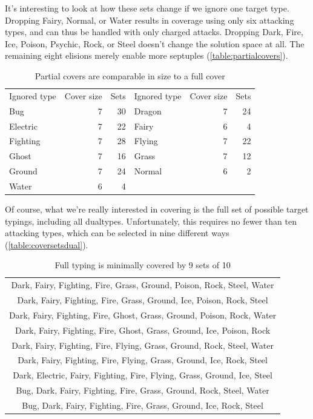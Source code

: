 It's interesting to look at how these sets change if we ignore one target type.
Dropping Fairy, Normal, or Water results in coverage using only six attacking types,
  and can thus be handled with only charged attacks.
Dropping Dark, Fire, Ice, Poison, Psychic, Rock, or Steel doesn't change the solution space at all.
The remaining eight elisions merely enable more septuples (\autoref{table:partialcovers}).
\begin{table}[ht]
\begin{centering}
  \begin{tabular}{lrr|lrr}
    Ignored type & Cover size & Sets & Ignored type & Cover size & Sets\\
    \Midrule
    Bug & 7 & 30 & Dragon & 7 & 24\\
    Electric & 7 & 22 & Fairy & 6 & 4\\
    Fighting & 7 & 28 & Flying & 7 & 22\\
    Ghost & 7 & 16 & Grass & 7 & 12\\
    Ground & 7 & 24 & Normal & 6 & 2\\
    Water & 6 & 4 & & & \\
  \end{tabular}
  \caption{Partial covers are comparable in size to a full cover}
  \label{table:partialcovers}
\end{centering}
\end{table}

Of course, what we're really interested in covering is the full set
  of possible target typings, including all dualtypes.
Unfortunately, this requires no fewer than ten attacking types,
  which can be selected in nine different ways (\autoref{table:coversetsdual}).
\begin{table}[ht]
\begin{centering}
  \begin{tabular}{c}
 Dark, Fairy, Fighting, Fire, Grass, Ground, Poison, Rock, Steel, Water\\
 Dark, Fairy, Fighting, Fire, Grass, Ground, Ice, Poison, Rock, Steel\\
 Dark, Fairy, Fighting, Fire, Ghost, Grass, Ground, Poison, Rock, Water\\
 Dark, Fairy, Fighting, Fire, Ghost, Grass, Ground, Ice, Poison, Rock\\
 Dark, Fairy, Fighting, Fire, Flying, Grass, Ground, Rock, Steel, Water\\
 Dark, Fairy, Fighting, Fire, Flying, Grass, Ground, Ice, Rock, Steel\\
 Dark, Electric, Fairy, Fighting, Fire, Flying, Grass, Ground, Ice, Steel\\
 Bug, Dark, Fairy, Fighting, Fire, Grass, Ground, Rock, Steel, Water\\
 Bug, Dark, Fairy, Fighting, Fire, Grass, Ground, Ice, Rock, Steel\\
  \end{tabular}
  \caption{Full typing is minimally covered by 9 sets of 10}
  \label{table:coversetsdual}
\end{centering}
\end{table}


